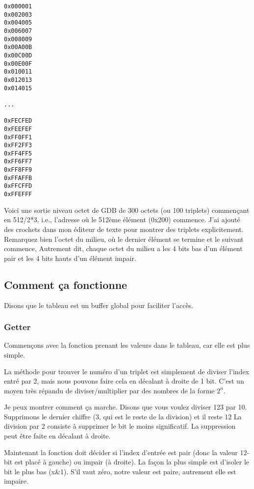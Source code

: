 \begin{lstlisting}
0x000001
0x002003
0x004005
0x006007
0x008009
0x00A00B
0x00C00D
0x00E00F
0x010011
0x012013
0x014015

...

0xFECFED
0xFEEFEF
0xFF0FF1
0xFF2FF3
0xFF4FF5
0xFF6FF7
0xFF8FF9
0xFFAFFB
0xFFCFFD
0xFFEFFF
\end{lstlisting}

Voici une sortie niveau octet de GDB de 300 octets (ou 100 triplets) commençant en
512/2*3, i.e., l'adresse où le 512ème élément (0x200) commence.
J'ai ajouté des crochets dans mon éditeur de texte pour montrer des triplets explicitement.
Remarquez bien l'octet du milieu, où le dernier élément se termine et le suivant commence,
Autrement dit, chaque octet du milieu a les 4 bits bas d'un élément pair et les 4
bits hauts d'un élément impair.



\subsection{Comment ça fonctionne}

Disons que le tableau est un buffer global pour faciliter l'accès.

\subsubsection{Getter}

Commençons avec la fonction prenant les valeurs dans le tableau, car elle est plus simple.

La méthode pour trouver le numéro d'un triplet est simplement de diviser l'index
entré par 2, mais nous pouvons faire cela en décalant à droite de 1 bit.
C'est un moyen très répandu de diviser/multiplier par des nombres de la forme $2^n$.

Je peux montrer comment ça marche. Disons que vous voulez diviser 123 par 10.
Supprimons le dernier chiffre (3, qui est le reste de la division) et il reste 12
La division par 2 consiste à supprimer le bit le moins significatif. La suppression
peut être faite en décalant à droite.

Maintenant la fonction doit décider si l'index d'entrée est pair (donc la valeur
12-bit est placé à gauche) ou impair (à droite).
La façon la plus simple est d'isoler le bit le plus bas (x\&1). S'il vaut zéro, notre
valeur est paire, autrement elle est impaire.

